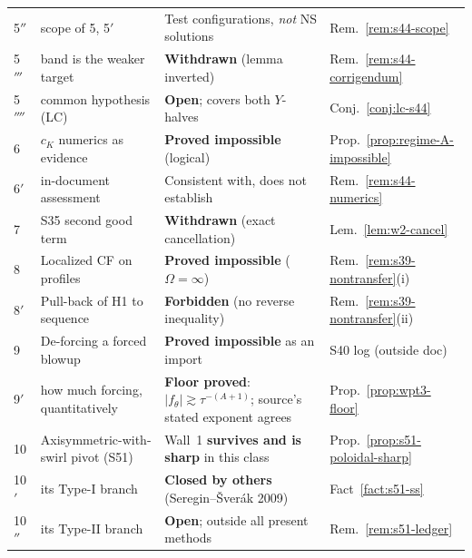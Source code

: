 \documentclass[11pt]{article}
\theoremstyle{definition}
\theoremstyle{remark}
\newcommand{\abs}[1]{\left|#1\right|}
\begin{document}
\begin{center}
\begin{tabular}{@{}l p{} p{} l@{}}
5$''$ & \quad scope of 5, 5$'$ & Test configurations, \emph{not} NS solutions
  & Rem.~\ref{rem:s44-scope} \\
5$'''$ & band is the weaker target & \textbf{Withdrawn} (lemma inverted)
  & Rem.~\ref{rem:s44-corrigendum} \\
5$''''$ & common hypothesis (LC) & \textbf{Open}; covers both $Y$-halves
  & Conj.~\ref{conj:lc-s44} \\
6 & $c_K$ numerics as evidence & \textbf{Proved impossible} (logical)
  & Prop.~\ref{prop:regime-A-impossible} \\
6$'$ & \quad in-document assessment & Consistent with, does not establish
  & Rem.~\ref{rem:s44-numerics} \\
7 & S35 second good term & \textbf{Withdrawn} (exact cancellation)
  & Lem.~\ref{lem:w2-cancel} \\
8 & Localized CF on profiles & \textbf{Proved impossible} ($\Omega=\infty$)
  & Rem.~\ref{rem:s39-nontransfer}(i) \\
8$'$ & Pull-back of H1 to sequence & \textbf{Forbidden} (no reverse inequality)
  & Rem.~\ref{rem:s39-nontransfer}(ii) \\
9 & De-forcing a forced blowup & \textbf{Proved impossible} as an import
  & S40 log (outside doc) \\
9$'$ & \quad how much forcing, quantitatively
  & \textbf{Floor proved}: $\abs{f_\theta}\gtrsim\tau^{-(A+1)}$; source's
  stated exponent agrees & Prop.~\ref{prop:wpt3-floor} \\
10 & Axisymmetric-with-swirl pivot (S51) & Wall~1 \textbf{survives and is sharp}
  in this class & Prop.~\ref{prop:s51-poloidal-sharp} \\
10$'$ & \quad its Type-I branch & \textbf{Closed by others}
  (Seregin--\v{S}ver\'ak 2009) & Fact~\ref{fact:s51-ss} \\
10$''$ & \quad its Type-II branch & \textbf{Open}; outside all present methods
  & Rem.~\ref{rem:s51-ledger} \\
\hline
\end{tabular}
\end{center}
\end{document}
